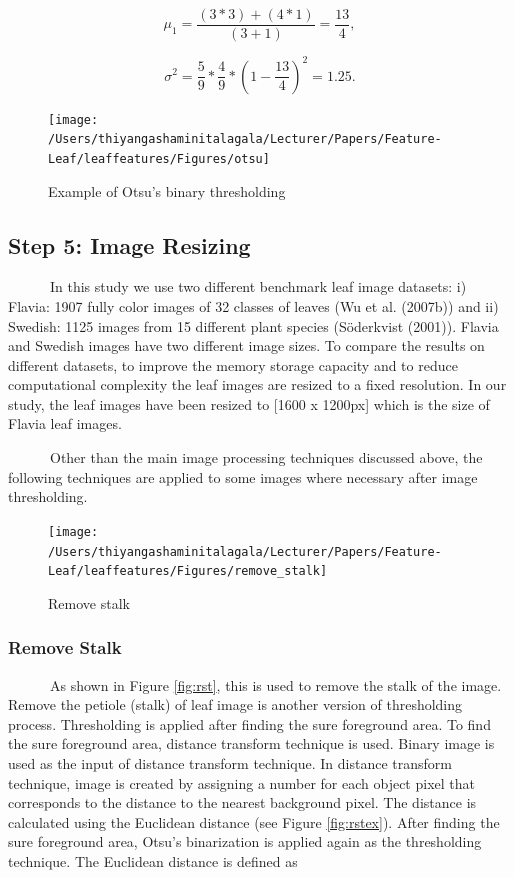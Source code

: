 \documentclass{article}
\begin{document}
\[\mu_1 = \frac{(3*3) +(4*1)}{(3+1)} = \frac{13}{4},\]

\[\sigma^2 = \frac{5}{9} * \frac{4}{9} * (1-\frac{13}{4})^2 = 1.25.\]

\begin{figure}[!ht]

{\centering \texttt{[image: /Users/thiyangashaminitalagala/Lecturer/Papers/Feature-Leaf/leaffeatures/Figures/otsu]} 

}

\caption{\label{fig:otsu}Example of Otsu's binary thresholding}\label{fig:unnamed-chunk-6}
\end{figure}

\hypertarget{step-5-image-resizing}{%
\subsection{Step 5: Image Resizing}\label{step-5-image-resizing}}

~~~~~~In this study we use two different benchmark leaf image datasets:
i) Flavia: 1907 fully color images of 32 classes of leaves (Wu et al.
(2007b)) and ii) Swedish: 1125 images from 15 different plant species
(Söderkvist (2001)). Flavia and Swedish images have two different image
sizes. To compare the results on different datasets, to improve the
memory storage capacity and to reduce computational complexity the leaf
images are resized to a fixed resolution. In our study, the leaf images
have been resized to {[}1600 x 1200px{]} which is the size of Flavia
leaf images.

~~~~~~Other than the main image processing techniques discussed above,
the following techniques are applied to some images where necessary
after image thresholding.

\begin{figure}[!ht]

{\centering \texttt{[image: /Users/thiyangashaminitalagala/Lecturer/Papers/Feature-Leaf/leaffeatures/Figures/remove\_stalk]} 

}

\caption{\label{fig:rst}Remove stalk}\label{fig:unnamed-chunk-7}
\end{figure}

\hypertarget{remove-stalk}{%
\subsubsection{Remove Stalk}\label{remove-stalk}}

~~~~~~As shown in Figure \ref{fig:rst}, this is used to remove the stalk
of the image. Remove the petiole (stalk) of leaf image is another
version of thresholding process. Thresholding is applied after finding
the sure foreground area. To find the sure foreground area, distance
transform technique is used. Binary image is used as the input of
distance transform technique. In distance transform technique, image is
created by assigning a number for each object pixel that corresponds to
the distance to the nearest background pixel. The distance is calculated
using the Euclidean distance (see Figure \ref{fig:rstex}). After finding
the sure foreground area, Otsu's binarization is applied again as the
thresholding technique. The Euclidean distance is defined as
\end{document}
